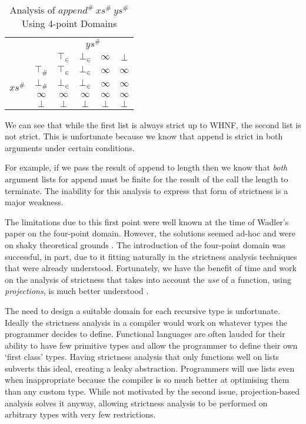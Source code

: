 \begin{table}[h!]
\centering
\vspace{10pt}
\begin{tabular}{c c || c c c c}
                               & \multicolumn{1}{c}{} & \multicolumn{4}{c}{$ys^{\#}$}            \\
                               &             & $\top_{\in}$ & $\bot_{\in}$ & $\infty$ & $\bot$   \\
    \cline{2-6}
    \multirow{4}{*}{$xs^{\#}$} & $\top_{\#}$ & $\top_{\in}$ & $\bot_{\in}$ & $\infty$ & $\infty$ \\
                               & $\bot_{\#}$ & $\bot_{\in}$ & $\bot_{\in}$ & $\infty$ & $\infty$ \\
                               & $\infty$    & $\infty$     & $\infty$     & $\infty$ & $\infty$ \\
                               & $\bot$      & $\bot$       & $\bot$       & $\bot$   & $\bot$
\end{tabular}    
\caption{Analysis of \(append^{\#}\ xs^{\#}\ ys^{\#}\) Using 4-point Domains}
\label{tab:append}
\end{table}


We can see that while the first list is always strict up to WHNF, the second
list is not strict. This is unfortunate because we know that \<append\> is
strict in both arguments under certain conditions.

For example, if we pass the result of \<append\> to \<length\> then we know
that \emph{both} argument lists for \<append\> must be finite for the result
of the call the \<length\> to terminate. The inability for this analysis
to express that form of strictness is a major weakness.

The limitations due to this first point were well known at the time of Wadler's
paper on the four-point domain. However, the solutions seemed ad-hoc and were
on shaky theoretical grounds \citep{hughes1986strictness, hughes1987analysing}. The
introduction of the four-point domain was successful, in part, due to it fitting
naturally in the strictness analysis techniques that were already understood.
Fortunately, we have the benefit of time and work on the analysis of strictness that
takes into account the \emph{use} of a function, using \emph{projections}, is
much better understood \citep{hinze1995projection, SergeyDemand}.

The need to design a suitable domain for each recursive type is unfortunate.
Ideally the strictness analysis in a compiler would work on whatever types the
programmer decides to define. Functional languages are often lauded for their
ability to have few primitive types and allow the programmer to define their
own `first class' types.  Having strictness analysis that only functions well
on lists subverts this ideal, creating a leaky abstraction. Programmers will
use lists even when inappropriate because the compiler is so much better at
optimising them than any custom type. While not motivated by the second issue,
projection-based analysis solves it anyway, allowing strictness analysis to be
performed on arbitrary types with very few restrictions.

